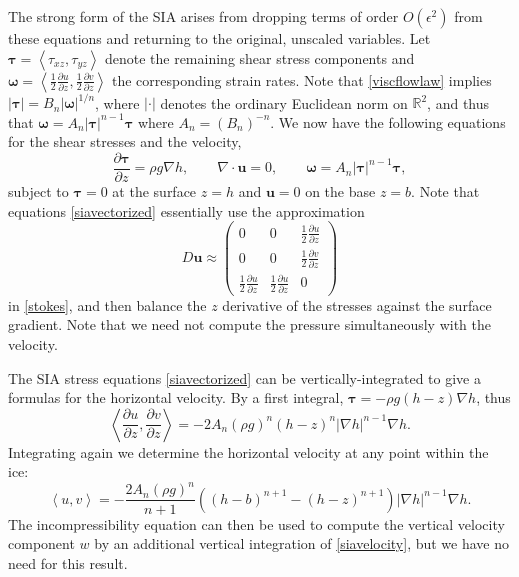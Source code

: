 \documentclass[letterpaper,final,12pt,reqno]{amsart}
\newcommand{\eps}{\epsilon}
\newcommand{\RR}{\mathbb{R}}
\newcommand{\grad}{\nabla}
\newcommand{\Div}{\nabla\cdot}
\newcommand{\bu}{\mathbf{u}}
\begin{document}
The strong form of the SIA arises from dropping terms of order $O(\eps^2)$ from these equations and returning to the original, unscaled variables.  Let $\bm{\tau}=\left<\tau_{xz},\tau_{yz}\right>$ denote the remaining shear stress components and $\bm{\omega}=\left<\frac{1}{2} \frac{\partial u}{\partial z},\frac{1}{2} \frac{\partial v}{\partial z}\right>$ the corresponding strain rates.  Note that \eqref{viscflowlaw} implies $|\bm{\tau}|=B_n |\bm{\omega}|^{1/n}$, where $|\cdot|$ denotes the ordinary Euclidean norm on $\RR^2$, and thus that $\bm{\omega} = A_n |\bm{\tau}|^{n-1} \bm{\tau}$ where $A_n=(B_n)^{-n}$.  We now have the following equations for the shear stresses and the velocity,
\begin{equation}
\frac{\partial\bm{\tau}}{\partial z} = \rho g \grad h, \qquad \Div \bu = 0, \qquad \bm{\omega} = A_n |\bm{\tau}|^{n-1} \bm{\tau}, \label{siavectorized}
\end{equation}
subject to $\bm{\tau}=0$ at the surface $z=h$ and $\bu=0$ on the base $z=b$.  Note that equations \eqref{siavectorized} essentially use the approximation
    $$D\bu \approx \begin{pmatrix} 0 & 0 & \frac{1}{2} \frac{\partial u}{\partial z} \\  0 & 0 & \frac{1}{2} \frac{\partial v}{\partial z} \\ \frac{1}{2} \frac{\partial u}{\partial z} & \frac{1}{2} \frac{\partial u}{\partial z} & 0 \end{pmatrix}$$
in \eqref{stokes}, and then balance the $z$ derivative of the stresses against the surface gradient.  Note that we need not compute the pressure simultaneously with the velocity.

The SIA stress equations \eqref{siavectorized} can be vertically-integrated to give a formulas for the horizontal velocity.  By a first integral, $\bm{\tau} = - \rho g (h-z) \grad h$, thus
    $$\left<\frac{\partial u}{\partial z},\frac{\partial v}{\partial z}\right> = - 2 A_n (\rho g)^n (h-z)^n |\grad h|^{n-1} \grad h.$$
Integrating again we determine the horizontal velocity at any point within the ice:
\begin{equation}
\left<u,v\right> = - \frac{2 A_n (\rho g)^n}{n+1} \left((h-b)^{n+1} - (h-z)^{n+1}\right) |\grad h|^{n-1} \grad h.  \label{siavelocity}
\end{equation}
The incompressibility equation can then be used to compute the vertical velocity component $w$ by an additional vertical integration of \eqref{siavelocity}, but we have no need for this result.
\end{document}
